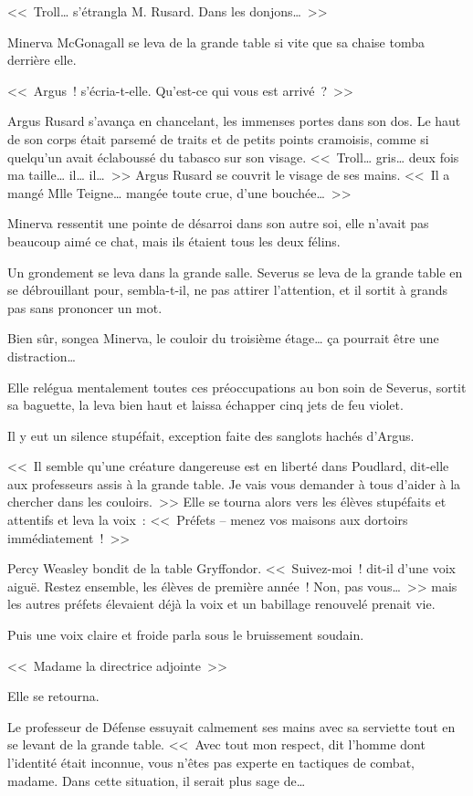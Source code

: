 <<~Troll… s'étrangla M. Rusard. Dans les donjons…~>>

Minerva McGonagall se leva de la grande table si vite que sa chaise tomba derrière elle.

<<~Argus~! s'écria-t-elle. Qu'est-ce qui vous est arrivé~?~>>

Argus Rusard s'avança en chancelant, les immenses portes dans son dos. Le haut de son corps était parsemé de traits et de petits points cramoisis, comme si quelqu'un avait éclaboussé du tabasco sur son visage. <<~Troll… gris… deux fois ma taille… il… il…~>> Argus Rusard se couvrit le visage de ses mains. <<~Il a mangé Mlle Teigne… mangée toute crue, d'une bouchée…~>>

Minerva ressentit une pointe de désarroi dans son autre soi, elle n'avait pas beaucoup aimé ce chat, mais ils étaient tous les deux félins.

Un grondement se leva dans la grande salle. Severus se leva de la grande table en se débrouillant pour, sembla-t-il, ne pas attirer l'attention, et il sortit à grands pas sans prononcer un mot.

Bien sûr, songea Minerva, le couloir du troisième étage… ça pourrait être une distraction…

Elle relégua mentalement toutes ces préoccupations au bon soin de Severus, sortit sa baguette, la leva bien haut et laissa échapper cinq jets de feu violet.

Il y eut un silence stupéfait, exception faite des sanglots hachés d'Argus.

<<~Il semble qu'une créature dangereuse est en liberté dans Poudlard, dit-elle aux professeurs assis à la grande table. Je vais vous demander à tous d'aider à la chercher dans les couloirs.~>> Elle se tourna alors vers les élèves stupéfaits et attentifs et leva la voix~: <<~Préfets -- menez vos maisons aux dortoirs immédiatement~!~>>

Percy Weasley bondit de la table Gryffondor. <<~Suivez-moi~! dit-il d'une voix aiguë. Restez ensemble, les élèves de première année~! Non, pas vous…~>> mais les autres préfets élevaient déjà la voix et un babillage renouvelé prenait vie.

Puis une voix claire et froide parla sous le bruissement soudain.

<<~Madame la directrice adjointe~>>

Elle se retourna.

Le professeur de Défense essuyait calmement ses mains avec sa serviette tout en se levant de la grande table. <<~Avec tout mon respect, dit l'homme dont l'identité était inconnue, vous n'êtes pas experte en tactiques de combat, madame. Dans cette situation, il serait plus sage de…


